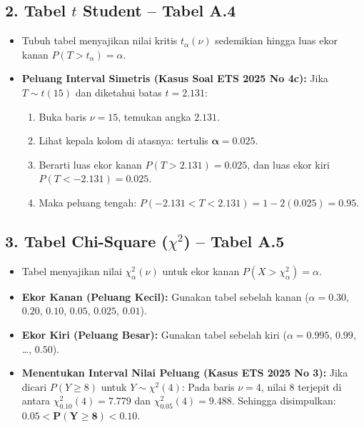 \documentclass[10pt,twoside]{article}
\begin{document}
\subsection{2. Tabel $t$ Student -- Tabel A.4}
\begin{itemize}
  \item Tubuh tabel menyajikan nilai kritis $t_\alpha(\nu)$ sedemikian hingga luas ekor kanan $P(T > t_\alpha) = \alpha$.
  \item \textbf{Peluang Interval Simetris (Kasus Soal ETS 2025 No 4c):}
  Jika $T \sim t(15)$ dan diketahui batas $t = 2.131$:
  \begin{enumerate}
    \item Buka baris $\nu = 15$, temukan angka $2.131$.
    \item Lihat kepala kolom di atasnya: tertulis $\mathbf{\alpha = 0.025}$.
    \item Berarti luas ekor kanan $P(T > 2.131) = 0.025$, dan luas ekor kiri $P(T < -2.131) = 0.025$.
    \item Maka peluang tengah: $P(-2.131 < T < 2.131) = 1 - 2(0.025) = \mathbf{0.95}$.
  \end{enumerate}
\end{itemize}

\subsection{3. Tabel Chi-Square ($\chi^2$) -- Tabel A.5}
\begin{itemize}
  \item Tabel menyajikan nilai $\chi^2_\alpha(\nu)$ untuk ekor kanan $P(X > \chi^2_\alpha) = \alpha$.
  \item \textbf{Ekor Kanan (Peluang Kecil):} Gunakan tabel sebelah kanan ($\alpha = 0.30$, $0.20$, $0.10$, $0.05$, $0.025$, $0.01$).
  \item \textbf{Ekor Kiri (Peluang Besar):} Gunakan tabel sebelah kiri ($\alpha = 0.995$, $0.99$, \dots, $0.50$).
  \item \textbf{Menentukan Interval Nilai Peluang (Kasus ETS 2025 No 3):}
  Jika dicari $P(Y \ge 8)$ untuk $Y \sim \chi^2(4)$:
  Pada baris $\nu = 4$, nilai $8$ terjepit di antara $\chi^2_{0.10}(4) = 7.779$ dan $\chi^2_{0.05}(4) = 9.488$.
  Sehingga disimpulkan: $\mathbf{0.05 < P(Y \ge 8) < 0.10}$.
\end{itemize}
\end{document}

